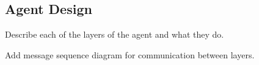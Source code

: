 \subsection{Agent Design}

Describe each of the layers of the agent and what they do.

Add message sequence diagram for communication between layers.
